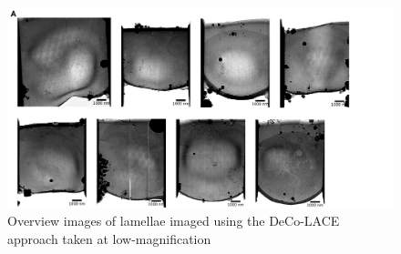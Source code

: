 \documentclass[
]{article}
\newenvironment{fignos:tagged-figure}[1][]{
    \let\oldthefigure\thefigure
    \let\oldtheHfigure\theHfigure
    \renewcommand{\thefigure}{#1}
    \renewcommand{\theHfigure}{#1}
  }{
    \let\thefigure\oldthefigure
    \let\theHfigure\oldtheHfigure
    \addtocounter{figure}{-1}
  }
\begin{document}
\begin{fignos:tagged-figure}[S2]

\begin{figure}
\hypertarget{fig:lamella_images}{%
\centering
\includegraphics{figures/lamella_images.png}
\caption{Overview images of lamellae imaged using the DeCo-LACE approach taken at low-magnification}\label{fig:lamella_images}
}
\end{figure}

\end{fignos:tagged-figure}
\end{document}
